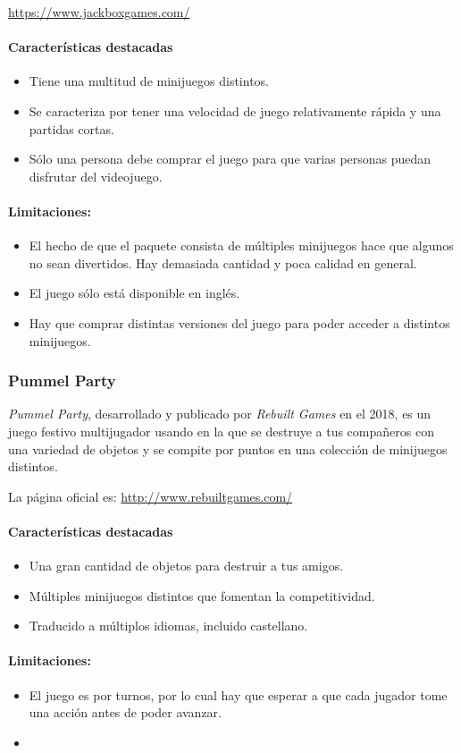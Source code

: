 \url{https://www.jackboxgames.com/}

\paragraph{Características destacadas}
\begin{itemize}
    \item Tiene una multitud de minijuegos distintos.
    \item Se caracteriza por tener una velocidad de juego relativamente rápida y
    una partidas cortas.
    \item Sólo una persona debe comprar el juego para que varias personas puedan
    disfrutar del videojuego.
\end{itemize}

\paragraph{Limitaciones:}
\begin{itemize}
    \item El hecho de que el paquete consista de múltiples minijuegos hace que
    algunos no sean divertidos. Hay demasiada cantidad y poca calidad en
    general.
    \item El juego sólo está disponible en inglés.
    \item Hay que comprar distintas versiones del juego para poder acceder a
    distintos minijuegos.
\end{itemize}

\subsubsection{Pummel Party}
\emph{Pummel Party}, desarrollado y publicado por \emph{Rebuilt Games} en el
2018, es un juego festivo multijugador usando en la que se destruye a tus
compañeros con una variedad de objetos y se compite por puntos en una colección
de minijuegos distintos.

La página oficial es: %
\url{http://www.rebuiltgames.com/}

\paragraph{Características destacadas}
\begin{itemize}
    \item Una gran cantidad de objetos para destruir a tus amigos.
    \item Múltiples minijuegos distintos que fomentan la competitividad.
    \item Traducido a múltiplos idiomas, incluido castellano.
\end{itemize}

\paragraph{Limitaciones:}
\begin{itemize}
    \item El juego es por turnos, por lo cual hay que esperar a que cada jugador
    tome una acción antes de poder avanzar.
    \item 
\end{itemize}
